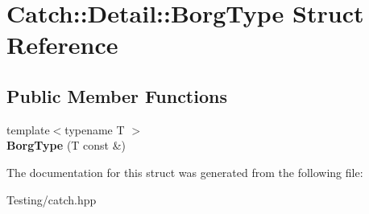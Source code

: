 \hypertarget{struct_catch_1_1_detail_1_1_borg_type}{\section{Catch\-:\-:Detail\-:\-:Borg\-Type Struct Reference}
\label{struct_catch_1_1_detail_1_1_borg_type}
}
\subsection*{Public Member Functions}
\begin{DoxyCompactItemize}
\item 
\hypertarget{struct_catch_1_1_detail_1_1_borg_type_a780a9946ed0d654f0bfc043c8fc505d8}{{\footnotesize template$<$typename T $>$ }\\{\bfseries Borg\-Type} (T const \&)}\label{struct_catch_1_1_detail_1_1_borg_type_a780a9946ed0d654f0bfc043c8fc505d8}

\end{DoxyCompactItemize}


The documentation for this struct was generated from the following file\-:\begin{DoxyCompactItemize}
\item 
Testing/catch.\-hpp\end{DoxyCompactItemize}
